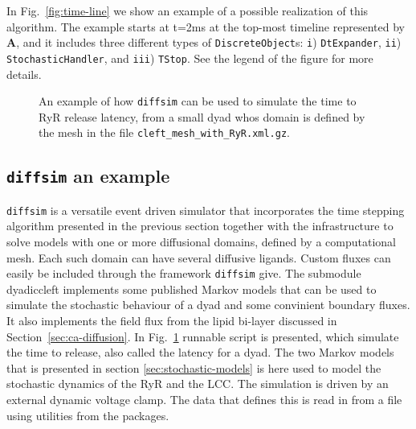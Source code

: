 In Fig.~\ref{fig:time-line} we show an example of a possible realization of this algorithm. The example starts at t=2ms at the top-most timeline represented by \textbf{A}, and it includes three different types of \texttt{DiscreteObject}s: \texttt{i}) \texttt{DtExpander}, \texttt{ii}) \texttt{StochasticHandler}, and \texttt{iii}) \texttt{TStop}. See the legend of the figure for more details.\par
\begin{figure}
  \centering
  \vspace{-1.5em}
  \caption{An example of how \texttt{diffsim} can be used to simulate the time to RyR release latency, from a small dyad whos domain is defined by the mesh in the file \texttt{cleft\_mesh\_with\_RyR.xml.gz}.}
  \label{fig:diffsim_test}
\end{figure}

\subsection{\texttt{diffsim} an example}
\texttt{diffsim} is a versatile event driven simulator that incorporates the time stepping algorithm presented in the previous section together with the infrastructure to solve models with one or more diffusional domains, defined by a computational mesh. Each such domain can have several diffusive ligands. Custom fluxes can easily be included through the framework \texttt{diffsim} give. The submodule dyadiccleft implements some published Markov models that can be used to simulate the stochastic behaviour of a dyad and some convinient boundary fluxes. It also implements the field flux from the lipid bi-layer discussed in Section~\ref{sec:ca-diffusion}. In Fig.~\ref{fig:diffsim_test} runnable script is presented, which simulate the time to release, also called the latency for a dyad. The two Markov models that is presented in section \ref{sec:stochastic-models} is here used to model the stochastic dynamics of the RyR and the LCC. The simulation is driven by an external dynamic voltage clamp. The data that defines this is read in from a file using utilities from the \numpy \python packages.



